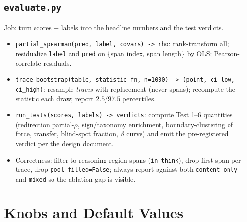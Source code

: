 \documentclass[11pt]{article}
\newcommand{\modu}[1]{\texttt{#1}}
\newcommand{\fn}[1]{\texttt{#1}}
\begin{document}
\subsection{\modu{evaluate.py}}
Job: turn scores + labels into the headline numbers and the test verdicts.
\begin{itemize}[leftmargin=1.5em]
  \item \fn{partial\_spearman(pred, label, covars) -> rho}: rank-transform all; residualize \texttt{label} and \texttt{pred} on \{span index, span length\} by OLS; Pearson-correlate residuals.
  \item \fn{trace\_bootstrap(table, statistic\_fn, n=1000) -> (point, ci\_low, ci\_high)}: resample \emph{traces} with replacement (never spans); recompute the statistic each draw; report $2.5/97.5$ percentiles.
  \item \fn{run\_tests(scores, labels) -> verdicts}: compute Test 1--6 quantities (redirection partial-$\rho$, sign/taxonomy enrichment, boundary-clustering of force, transfer, blind-spot fraction, $\beta$ curve) and emit the pre-registered verdict per the design document.
  \item Correctness: filter to reasoning-region spans (\texttt{in\_think}), drop first-span-per-trace, drop \texttt{pool\_filled=False}; always report against both \texttt{content\_only} and \texttt{mixed} so the ablation gap is visible.
\end{itemize}

\section{Knobs and Default Values}
\label{sec:knobs}
\end{document}
